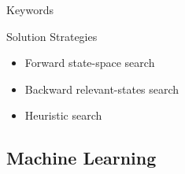 \begin{frame}{\insertsubsection{}  }
\begin{fancycolumns}[animation=none]
\begin{example}{Keywords}
\begin{itemize}
			\end{itemize}
		\end{example} \pause
		\begin{note}{Solution Strategies}
			\begin{itemize}
				\item Forward state-space search
				\item Backward relevant-states search
				\item Heuristic search
			\end{itemize}
		\end{note} 
	\end{fancycolumns}
\end{frame}

\subsection{Machine Learning}


